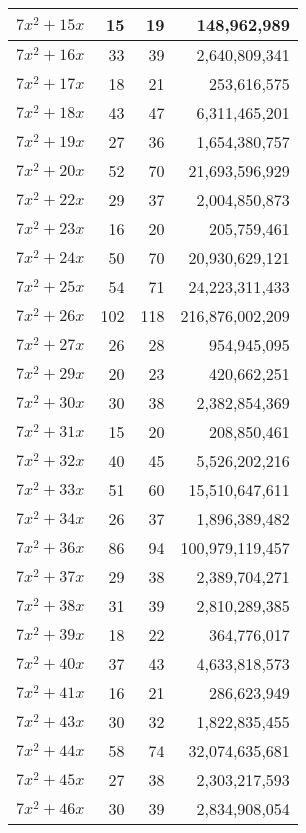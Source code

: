 \documentclass[a4paper]{amsproc}
\theoremstyle{plain}
\begin{document}
\begin{longtable}{ | l | r | r | r | }
$7x^2 + 15x$ & 15 & 19 & 148{,}962{,}989 \\ \hline
$7x^2 + 16x$ & 33 & 39 & 2{,}640{,}809{,}341 \\ \hline
$7x^2 + 17x$ & 18 & 21 & 253{,}616{,}575 \\ \hline
$7x^2 + 18x$ & 43 & 47 & 6{,}311{,}465{,}201 \\ \hline
$7x^2 + 19x$ & 27 & 36 & 1{,}654{,}380{,}757 \\ \hline
$7x^2 + 20x$ & 52 & 70 & 21{,}693{,}596{,}929 \\ \hline
$7x^2 + 22x$ & 29 & 37 & 2{,}004{,}850{,}873 \\ \hline
$7x^2 + 23x$ & 16 & 20 & 205{,}759{,}461 \\ \hline
$7x^2 + 24x$ & 50 & 70 & 20{,}930{,}629{,}121 \\ \hline
$7x^2 + 25x$ & 54 & 71 & 24{,}223{,}311{,}433 \\ \hline
$7x^2 + 26x$ & 102 & 118 & 216{,}876{,}002{,}209 \\ \hline
$7x^2 + 27x$ & 26 & 28 & 954{,}945{,}095 \\ \hline
$7x^2 + 29x$ & 20 & 23 & 420{,}662{,}251 \\ \hline
$7x^2 + 30x$ & 30 & 38 & 2{,}382{,}854{,}369 \\ \hline
$7x^2 + 31x$ & 15 & 20 & 208{,}850{,}461 \\ \hline
$7x^2 + 32x$ & 40 & 45 & 5{,}526{,}202{,}216 \\ \hline
$7x^2 + 33x$ & 51 & 60 & 15{,}510{,}647{,}611 \\ \hline
$7x^2 + 34x$ & 26 & 37 & 1{,}896{,}389{,}482 \\ \hline
$7x^2 + 36x$ & 86 & 94 & 100{,}979{,}119{,}457 \\ \hline
$7x^2 + 37x$ & 29 & 38 & 2{,}389{,}704{,}271 \\ \hline
$7x^2 + 38x$ & 31 & 39 & 2{,}810{,}289{,}385 \\ \hline
$7x^2 + 39x$ & 18 & 22 & 364{,}776{,}017 \\ \hline
$7x^2 + 40x$ & 37 & 43 & 4{,}633{,}818{,}573 \\ \hline
$7x^2 + 41x$ & 16 & 21 & 286{,}623{,}949 \\ \hline
$7x^2 + 43x$ & 30 & 32 & 1{,}822{,}835{,}455 \\ \hline
$7x^2 + 44x$ & 58 & 74 & 32{,}074{,}635{,}681 \\ \hline
$7x^2 + 45x$ & 27 & 38 & 2{,}303{,}217{,}593 \\ \hline
$7x^2 + 46x$ & 30 & 39 & 2{,}834{,}908{,}054 \\ \hline

\end{longtable}
\end{document}
